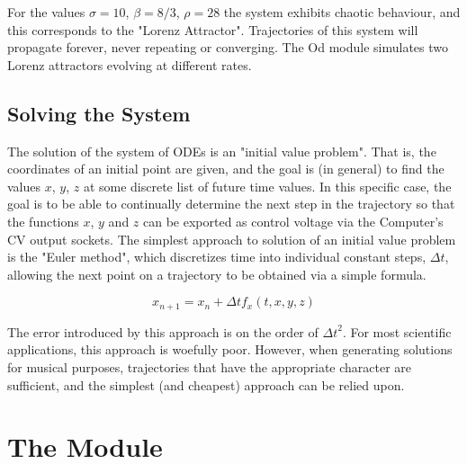 \documentclass{tufte-handout}
\begin{document}
For the values $\sigma=10$, $\beta=8/3$, $\rho=28$ the system exhibits chaotic behaviour, and this corresponds to the "Lorenz Attractor". Trajectories of this system will propagate forever, never repeating or converging. The Od module simulates two Lorenz attractors evolving at different rates.


\subsection{Solving the System}\label{sec:solving_the_system}

The solution of the system of ODEs is an "initial value problem". That is, the coordinates of an initial point are given, and the goal is (in general) to find the values $x$, $y$, $z$ at some discrete list of future time values. In this specific case, the goal is to be able to continually determine the next step in the trajectory so that the functions $x$, $y$ and $z$ can be exported as control voltage via the Computer's CV output sockets.
The simplest approach to solution of an initial value problem is the "Euler method", which discretizes time into individual constant steps, $\Delta t$, allowing the next point on a trajectory to be obtained via a simple formula.

$$x_{n+1} = x_n + \Delta t f_{x}(t, x, y, z)$$

The error introduced by this approach is on the order of ${\Delta t}^2$. For most scientific applications, this approach is woefully poor. However, when generating solutions for musical purposes, trajectories that have the appropriate character are sufficient, and the simplest (and cheapest) approach can be relied upon.

\section{The Module}\label{sec:the_module}
\end{document}
